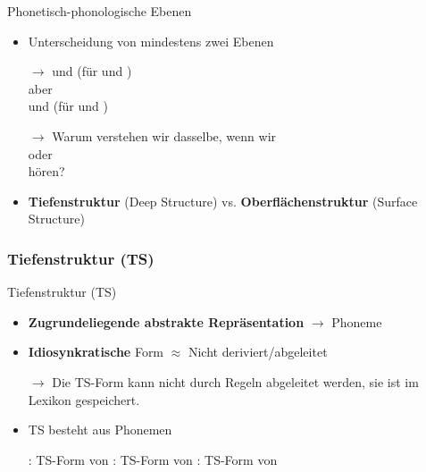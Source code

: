 \begin{frame}{Phonetisch-phonologische Ebenen}

	\begin{itemize}
		\item Unterscheidung von mindestens zwei Ebenen
		\item[$\rightarrow$] \textipa{[\textscr a: t]} und \textipa{[\textscr E: d 5]} (für  und )\\
		aber\\
		\textipa{[\textscr a: t]} und \textipa{[\textscr E: t @]} (für  und )
		\item[]
		\item[$\rightarrow$] Warum verstehen wir dasselbe, wenn wir\\
		\textipa{[h a: k @ n]} oder \textipa{[h a: k N]}\\
		hören?
		\item[]
		\item \textbf{Tiefenstruktur} (Deep Structure) vs. \textbf{Oberflächenstruktur} (Surface Structure)
	\end{itemize}
	
\end{frame}



%
\subsubsection{Tiefenstruktur (TS)}
%

\begin{frame}{Tiefenstruktur (TS)}
	
\begin{itemize}
	\item \textbf{Zugrundeliegende abstrakte Repräsentation} $\rightarrow$ Phoneme \textipa{/ /}
	\item[]
	\item \textbf{Idiosynkratische} Form $\approx$ Nicht deriviert/abgeleitet
	\item[$\rightarrow$] Die TS-Form kann nicht durch Regeln abgeleitet werden, sie ist im Lexikon gespeichert.
	\item[]
	\item TS besteht aus Phonemen
	
	\eal
		\ex {}: TS-Form von 
		\ex {}: TS-Form von 
		\ex {}: TS-Form von 
	\zl
	
\end{itemize}
		
\end{frame}



